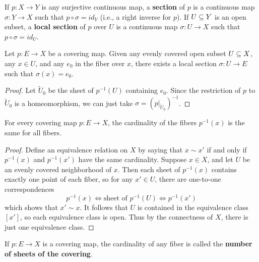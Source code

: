 If $p:X\to Y$ is any surjective continuous map, a \textbf{section} of $p$ is a continuous map $\sigma:Y\to X$ such that $p\circ\sigma=id_Y$ (i.e., a right inverse for $p$). If $U\subseteq Y$ is an open subset, a \textbf{local section} of $p$ over $U$ is a continuous map $\sigma:U\to X$ such that $p\circ\sigma=id_U$.
\begin{proposition}
Let $p:E\to X$ be a covering map. Given any evenly covered open subset $U\subseteq X$, any $x\in U$, and any $e_0$ in the fiber over $x$, there exists a local section $\sigma:U\to E$ such that $\sigma(x)=e_0$.
\end{proposition}
\begin{proof}
Let $\widetilde{U}_0$ be the sheet of $p^{-1}(U)$ containing $e_0$. Since the restriction of $p$ to $\widetilde{U}_0$ is a homeomorphism, we can just take $\sigma=(p|_{\widetilde{U}_0})^{-1}$.
\end{proof}
\begin{proposition}
For every covering map $p:E\to X$, the cardinality of the fibers $p^{-1}(x)$ is the same for all fibers.
\end{proposition}
\begin{proof}
Define an equivalence relation on $X$ by saying that $x\sim x'$ if and only if $p^{-1}(x)$ and $p^{-1}(x')$ have the same cardinality. Suppose $x\in X$, and let $U$ be an evenly covered neighborhood of $x$. Then each sheet of $p^{-1}(x)$ contains exactly one point of each fiber, so for any $x'\in U$, there are one-to-one correspondences
\[p^{-1}(x)\Longleftrightarrow\text{sheet of }p^{-1}(U)\Longleftrightarrow p^{-1}(x')\]
which shows that $x'\sim x$. It follows that $U$ is contained in the equivalence class
$[x']$, so each equivalence class is open. Thus by the connectness of $X$, there is just one equivalence class.
\end{proof}
If $p:E\to X$ is a covering map, the cardinality of any fiber is called the \textbf{number
of sheets of the covering}.
